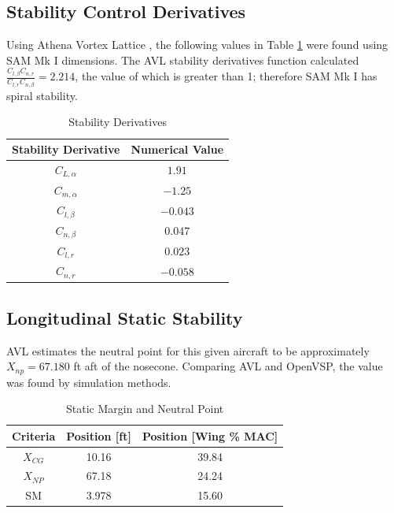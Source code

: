 \subsection{Stability Control Derivatives}
Using Athena Vortex Lattice \cite{avl}, the following values in Table \ref{tab:deriv} were found using SAM Mk I dimensions.  The AVL stability derivatives function calculated $\frac{C_{l,\beta}C_{n,r}}{C_{l,r}C_{n,\beta}} = 2.214$, the value of which is greater than 1; therefore SAM Mk I has spiral stability.
\begin{table}[!h]
    \centering
    \caption{Stability Derivatives}
    \begin{tabular}{|c|c|}\toprule
        \textbf{Stability Derivative} & \textbf{Numerical Value} \\\hline\hline
        $C_{L,\alpha}$ & $1.91$ \\\hline
        $C_{m,\alpha}$ & $-1.25$ \\\hline
        $C_{l,\beta}$ & $-0.043$ \\\hline
        $C_{n,\beta}$ & $0.047$ \\\hline
        $C_{l,r}$ & $0.023$ \\\hline
        $C_{n,r}$ & $-0.058$ \\\hline
    \end{tabular}
    \label{tab:deriv}
\end{table}

\subsection{Longitudinal Static Stability}
AVL estimates the neutral point for this given aircraft to be approximately $X_{np} = 67.180$ ft aft of the nosecone.  Comparing AVL and OpenVSP, the value was found by simulation methods.
\begin{table}[!h]
    \centering
    \caption{Static Margin and Neutral Point}
    \begin{tabular}{|c||c|c|} \toprule
        \textbf{Criteria} & \textbf{Position [ft]} & \textbf{Position [Wing \% MAC]} \\\hline\hline
        $X_{CG}$ & 10.16 & 39.84 \\\hline
        $X_{NP}$ & 67.18 & 24.24\\\hline
        SM & 3.978 & 15.60 \\\bottomrule
    \end{tabular}
    \label{tab:statstab}
\end{table}
\clearpage

